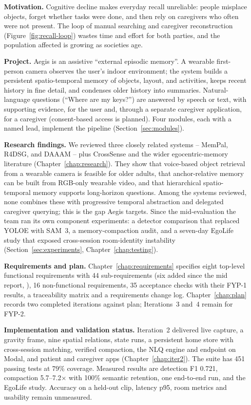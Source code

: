 \textbf{Motivation.} Cognitive decline makes everyday recall unreliable:
people misplace objects, forget whether tasks were done, and then rely on
caregivers who often were not present. The loop of manual searching and
caregiver reconstruction (Figure~\ref{fig:recall-loop}) wastes time and effort
for both parties, and the population affected is growing as societies age.

\textbf{Project.} Aegis is an assistive ``external episodic memory''. A
wearable first-person camera observes the user's indoor environment; the system
builds a persistent spatio-temporal memory of objects, layout, and activities,
keeps recent history in fine detail, and condenses older history into
summaries. Natural-language questions (``Where are my keys?'') are answered by
speech or text, with supporting evidence, for the user and, through a separate
caregiver application, for a caregiver (consent-based access is planned). Four
modules, each with a named lead, implement the pipeline
(Section~\ref{sec:modules}).

\textbf{Research findings.} We reviewed three closely related systems --
MemPal, R4DSG, and DAAAM -- plus CrossSense and the wider egocentric-memory
literature (Chapter~\ref{chap:research}). They show that voice-based object
retrieval from a wearable camera is feasible for older adults, that
anchor-relative memory can be built from RGB-only wearable video, and that
hierarchical spatio-temporal memory supports long-horizon questions. Among the
systems reviewed, none combines these with progressive temporal abstraction and
delegated caregiver querying; this is the gap Aegis targets. Since the
mid-evaluation the team ran its own component experiments: a detector
comparison that replaced YOLOE with SAM~3, a memory-compaction audit, and a
seven-day EgoLife study that exposed cross-session room-identity instability
(Section~\ref{sec:experiments}, Chapter~\ref{chap:testing}).

\textbf{Requirements and plan.} Chapter~\ref{chap:requirements} specifies eight
top-level functional requirements with 44 sub-requirements (six added since the
mid report, ), 16 non-functional requirements,
35 acceptance checks with their FYP-1 results, a traceability matrix and a
requirements change log. Chapter~\ref{chap:plan} records two completed
iterations against plan; Iterations~3 and~4 remain for FYP-2.

\textbf{Implementation and validation status.} Iteration~2 delivered live
capture, a gravity frame, nine spatial relations, state runs, a persistent home
store with cross-session matching, verified compaction, the NLQ engine and
 endpoint on Modal, and patient and caregiver apps
(Chapter~\ref{chap:iter2}). The suite has 451 passing tests at 79\% coverage.
Measured results are detection F1 0.721, compaction 5.7--7.2$\times$ with 100\%
semantic retention, one end-to-end run, and the EgoLife study. Accuracy on a
held-out clip, latency p95, room metrics and usability remain unmeasured.


